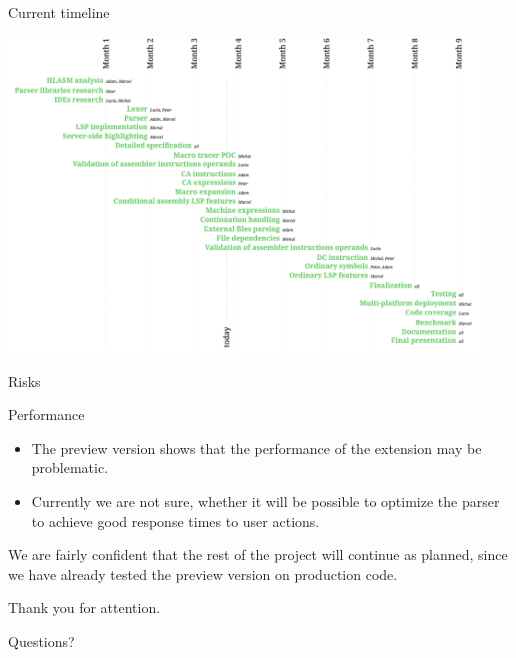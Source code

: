 \documentclass[10pt]{beamer}
\begin{document}
\begin{frame}{Current timeline}

\centering
\hspace*{-0.95cm}
\includegraphics[width=12.5cm]{img/timeline}

\end{frame}


\begin{frame}{Risks}

\large
Performance
\normalsize
\begin{itemize}
	\item The preview version shows that the performance of the extension may be problematic.
	\item Currently we are not sure, whether it will be possible to optimize the parser to achieve good response times to user actions.
\end{itemize}

We are fairly confident that the rest of the project will continue as planned, since we have already tested the preview version on production code.


\end{frame}


\begin{frame}[standout]

  Thank you for attention.

  \small Questions?
\end{frame}
\end{document}
